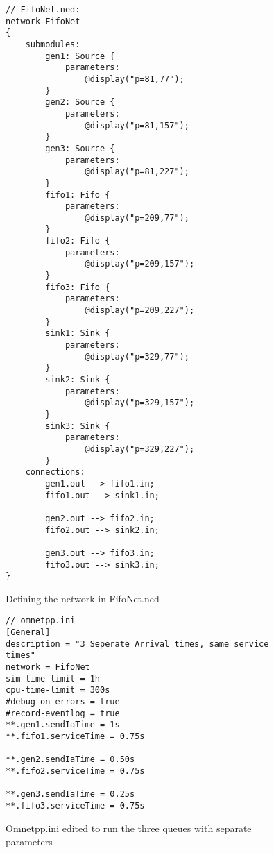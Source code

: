 \documentclass{article}
\begin{document}
\begin{figure}[H]
\label{FifoNet}
\begin{lstlisting}
// FifoNet.ned:
network FifoNet
{
    submodules:
        gen1: Source {
            parameters:
                @display("p=81,77");
        }
        gen2: Source {
            parameters:
                @display("p=81,157");
        }
        gen3: Source {
            parameters:
                @display("p=81,227");
        }
        fifo1: Fifo {
            parameters:
                @display("p=209,77");
        }
        fifo2: Fifo {
            parameters:
                @display("p=209,157");
        }
        fifo3: Fifo {
            parameters:
                @display("p=209,227");
        }
        sink1: Sink {
            parameters:
                @display("p=329,77");
        }
        sink2: Sink {
            parameters:
                @display("p=329,157");
        }
        sink3: Sink {
            parameters:
                @display("p=329,227");
        }
    connections:
        gen1.out --> fifo1.in;
        fifo1.out --> sink1.in;

        gen2.out --> fifo2.in;
        fifo2.out --> sink2.in;

        gen3.out --> fifo3.in;
        fifo3.out --> sink3.in;
}
\end{lstlisting}
\vspace{-1cm}
\caption{Defining the network in FifoNet.ned}
\end{figure}

\begin{figure}[H]
\label{Omnet_ini}
\begin{lstlisting}
// omnetpp.ini
[General]
description = "3 Seperate Arrival times, same service times"
network = FifoNet
sim-time-limit = 1h
cpu-time-limit = 300s
#debug-on-errors = true
#record-eventlog = true
**.gen1.sendIaTime = 1s
**.fifo1.serviceTime = 0.75s

**.gen2.sendIaTime = 0.50s
**.fifo2.serviceTime = 0.75s

**.gen3.sendIaTime = 0.25s
**.fifo3.serviceTime = 0.75s
\end{lstlisting}
\vspace{-1cm}
\caption{Omnetpp.ini edited to run the three queues with separate parameters}
\end{figure}
\end{document}
